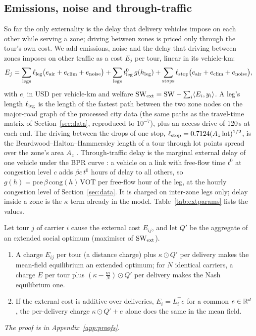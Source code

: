 \subsection{Emissions, noise and through-traffic}\label{sec:extern}
So far the only externality is the delay that delivery vehicles impose on each other while serving a zone; driving between zones is priced only through the tour's own cost. We add emissions, noise and the delay that driving between zones imposes on other traffic as a cost $E_j$ per tour, linear in its vehicle-km:
\[
E_j=\sum_{\text{legs}}\ell_{\rm leg}\big(e_{\rm air}+e_{\rm clim}+e_{\rm noise}\big)+\sum_{\text{legs}}t^0_{\rm leg}\,g(h_{\rm leg})+\sum_{\text{stops}}\ell_{\rm stop}\big(e_{\rm air}+e_{\rm clim}+e_{\rm noise}\big),
\]
with $e_\cdot$ in USD per vehicle-km and welfare $\mathrm{SW}_{\rm ext}=\mathrm{SW}-\sum_i\langle E_i,y_i\rangle$. A leg's length $\ell_{\rm leg}$ is the length of the fastest path between the two zone nodes on the major-road graph of the processed city data (the same paths as the travel-time matrix of Section~\ref{sec:data}, reproduced to $10^{-7}$), plus an access drive of 120\,s at each end. The driving between the drops of one stop, $\ell_{\rm stop}=0.7124(A_z\,\mathrm{lot})^{1/2}$, is the Beardwood--Halton--Hammersley length of a tour through $\mathrm{lot}$ points spread over the zone's area $A_z$ \citep{BHH1959}. Through-traffic delay is the marginal external delay of one vehicle under the BPR curve \citep{BPR1964}: a vehicle on a link with free-flow time $t^0$ at congestion level $c$ adds $\beta c\,t^0$ hours of delay to all others, so $g(h)=\mathrm{pce}\,\beta\,\mathrm{cong}(h)\,\mathrm{VOT}$ per free-flow hour of the leg, at the hourly congestion level of Section~\ref{sec:data}. It is charged on inter-zone legs only; delay inside a zone is the $\kappa$ term already in the model. Table~\ref{tab:extparams} lists the values.



\begin{proposition}\label{prop:extcharge}
Let tour $j$ of carrier $i$ cause the external cost $E_{ij}$, and let $Q'$ be the aggregate of an extended social optimum (maximiser of $\mathrm{SW}_{\rm ext}$).
\begin{enumerate}
\item[(a)] A charge $E_{ij}$ per tour (a distance charge) plus $\kappa\odot Q'$ per delivery makes the mean-field equilibrium an extended optimum; for $N$ identical carriers, a charge $E$ per tour plus $(\kappa-\tfrac mN)\odot Q'$ per delivery makes the Nash equilibrium one.
\item[(b)] If the external cost is additive over deliveries, $E_i=L_i^\top e$ for a common $e\in\mathbb{R}^d$, the per-delivery charge $\kappa\odot Q'+e$ alone does the same in the mean field.
\end{enumerate}
\end{proposition}
\emph{The proof is in Appendix~\ref{app:proofs}.}

